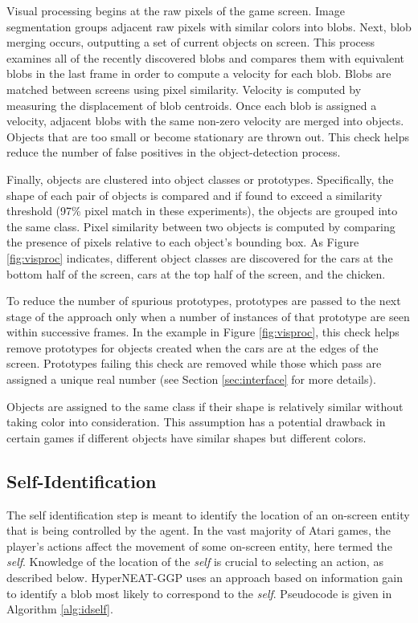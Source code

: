 \documentclass{sig-alternate}
\begin{document}
Visual processing begins at the raw pixels of the game screen. Image segmentation groups adjacent raw pixels with similar colors into blobs. Next, blob merging occurs, outputting a set of current objects on screen. This process examines all of the recently discovered blobs and compares them with equivalent blobs in the last frame in order to compute a velocity for each blob. Blobs are matched between screens using pixel similarity. Velocity is computed by measuring the displacement of blob centroids. Once each blob is assigned a velocity, adjacent blobs with the same non-zero velocity are merged into objects. Objects that are too small or become stationary are thrown out. This check helps reduce the number of false positives in the object-detection process.

Finally, objects are clustered into object classes or prototypes. Specifically, the shape of each pair of objects is compared and if found to exceed a similarity threshold (97\% pixel match in these experiments), the objects are grouped into the same class. Pixel similarity between two objects is computed by comparing the presence of pixels relative to each object's bounding box. As Figure \ref{fig:visproc} indicates, different object classes are discovered for the cars at the bottom half of the screen, cars at the top half of the screen, and the chicken. 

To reduce the number of spurious prototypes, prototypes are passed to the next stage of the approach only when a number of instances of that prototype are seen within successive frames. In the example in Figure \ref{fig:visproc}, this check helps remove prototypes for objects created when the cars are at the edges of the screen. Prototypes failing this check are removed while those which pass are assigned a unique real number (see Section \ref{sec:interface} for more details).

Objects are assigned to the same class if their shape is relatively similar without taking color into consideration. This assumption has a potential drawback in certain games if different objects have similar shapes but different colors. 

\subsection{Self-Identification}
The self identification step is meant to identify the location of an on-screen entity that is being controlled by the agent. In the vast majority of Atari games, the player's actions affect the movement of some on-screen entity, here termed the \textit{self}. Knowledge of the location of the \textit{self} is crucial to selecting an action, as described below. HyperNEAT-GGP uses an approach based on information gain to identify a blob most likely to correspond to the \textit{self}. Pseudocode is given in Algorithm \ref{alg:idself}.
\end{document}
